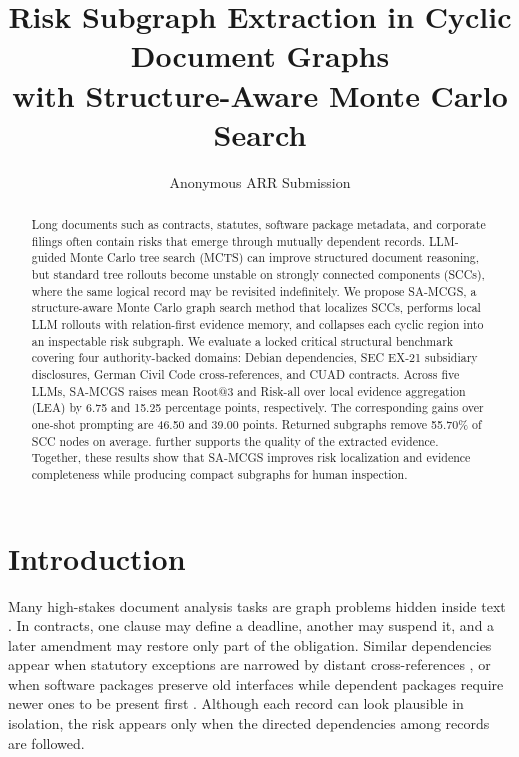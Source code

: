 \documentclass[11pt]{article}
\title{Risk Subgraph Extraction in Cyclic Document Graphs\\
with Structure-Aware Monte Carlo Search}
\author{Anonymous ARR Submission}
\makeatletter
\newcommand{\samcgs}{SA-MCGS}
\newcommand{\riskall}{Risk-all}
\newcommand{\rootthree}{Root@3}
\makeatother
\begin{document}
\maketitle

\begin{abstract}
Long documents such as contracts, statutes, software package metadata, and corporate filings often contain risks that emerge through mutually dependent records.  LLM-guided Monte Carlo tree search (MCTS) can improve structured document reasoning, but standard tree rollouts become unstable on strongly connected components (SCCs), where the same logical record may be revisited indefinitely.  We propose \samcgs{}, a structure-aware Monte Carlo graph search method that localizes SCCs, performs local LLM rollouts with relation-first evidence memory, and collapses each cyclic region into an inspectable risk subgraph.  We evaluate a locked critical structural benchmark covering four authority-backed domains: Debian dependencies, SEC EX-21 subsidiary disclosures, German Civil Code cross-references, and CUAD contracts.  Across five LLMs, \samcgs{} raises mean \rootthree{} and \riskall{} over local evidence aggregation (LEA) by 6.75 and 15.25 percentage points, respectively. The corresponding gains over one-shot prompting are 46.50 and 39.00 points. Returned subgraphs remove 55.70\% of SCC nodes on average.  further supports the quality of the extracted evidence. Together, these results show that \samcgs{} improves risk localization and evidence completeness while producing compact subgraphs for human inspection.
\end{abstract}

\section{Introduction}
\label{sec:intro}

Many high-stakes document analysis tasks are graph problems hidden inside text \citep{hendrycks2021cuad,koreeda2021contractnli,boulet2021measuring}.  In contracts, one clause may define a deadline, another may suspend it, and a later amendment may restore only part of the obligation.  Similar dependencies appear when statutory exceptions are narrowed by distant cross-references \citep{boulet2021measuring,holzenberger2020sara}, or when software packages preserve old interfaces while dependent packages require newer ones to be present first \citep{debianPolicyRelationships,debianPolicySharedLibraries}.  Although each record can look plausible in isolation, the risk appears only when the directed dependencies among records are followed.
\end{document}
